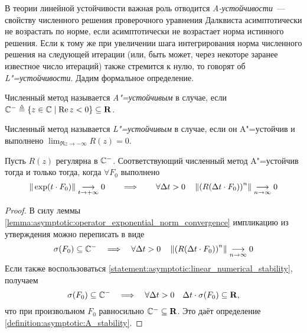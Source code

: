 В теории линейной устойчивости важная роль отводится \emph{A-ус\-той\-чи\-вос\-ти}~---
свойству численного решения проверочного уравнения Далквиста асимптотически не возрастать по норме,
если асимптотически не возрастает норма истинного решения.
Если к тому же при увеличении шага интегрирования норма численного решения на следующей итерации (или, быть может, через некоторе заранее известное число итераций)
также стремится к нулю, то говорят об \emph{L"=устойчивости}.
Дадим формальное определение.

\begin{definition}
    \label{definition:asymptotic:A_stability}
    Численный метод называется \emph{A"=устойчивым} в случае,
    если $ \mathbb{C}^- \triangleq \{ z \in \mathbb{C} \mid \operatorname{Re} z < 0 \} \subseteq \mathbf{R} $.
\end{definition}

\begin{definition}
    \label{definition:asymptotic:L_stability}
    Численный метод называется \emph{L"=устойчивым} в случае,
    если он A"=устойчив и выполнено $ \displaystyle\lim_{\Re z \to -\infty} R(z) = 0 $.
\end{definition}

\begin{statement}
    \label{statement:asymptotic:A_stability_criterion}
    Пусть $ R(z) $ регулярна в $ \mathbb{C}^- $.
    Соответствующий численный метод A"=устойчив тогда и только тогда, когда $ \forall F_0 $ выполнено
    \[
        \| \exp(t \cdot F_0) \| \underset{t \to +\infty}{\longrightarrow} 0 \qquad \Longrightarrow \qquad \forall \Delta t > 0 \quad \left \| \left( R(\Delta t \cdot F_0) \right)^n \right\| \underset{n \to \infty}{\longrightarrow} 0
    \]
\end{statement}

\begin{proof}
    В силу леммы \ref{lemma:asymptotic:operator_exponential_norm_convergence} импликацию из утверждения можно переписать в виде
    \[
        \sigma(F_0) \subseteq \mathbb{C}^- \quad \Longrightarrow \quad \forall \Delta t > 0 \quad \left \| \left( R(\Delta t \cdot F_0) \right)^n \right\| \underset{n \to \infty}{\longrightarrow} 0
    \]
    Если также воспользоваться \ref{statement:asymptotic:linear_numerical_stability}, получаем
    \[
        \sigma(F_0) \subseteq \mathbb{C}^- \quad \Longrightarrow \quad \forall \Delta t > 0 \quad \Delta t \cdot \sigma(F_0) \subseteq \mathbf{R},
    \]
    что при произвольном $ F_0 $ равносильно $ \mathbb{C}^- \subseteq \mathbf{R} $.
    Это даёт определение \ref{definition:asymptotic:A_stability}.
\end{proof}

